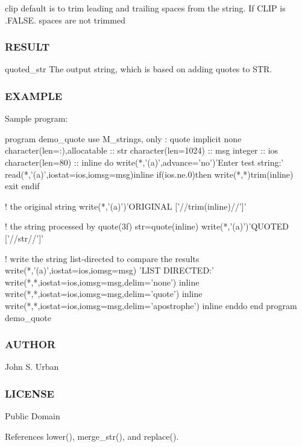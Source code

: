 clip default is to trim leading and trailing spaces from the string. If C\+L\+IP is .F\+A\+L\+SE. spaces are not trimmed

\subsubsection*{R\+E\+S\+U\+LT}

quoted\+\_\+str The output string, which is based on adding quotes to S\+TR. \subsubsection*{E\+X\+A\+M\+P\+LE}

Sample program\+: \begin{DoxyVerb}program demo_quote
use M_strings, only : quote
implicit none
character(len=:),allocatable :: str
character(len=1024)          :: msg
integer                      :: ios
character(len=80)            :: inline
   do
      write(*,'(a)',advance='no')'Enter test string:'
      read(*,'(a)',iostat=ios,iomsg=msg)inline
      if(ios.ne.0)then
         write(*,*)trim(inline)
         exit
      endif

      ! the original string
      write(*,'(a)')'ORIGINAL     ['//trim(inline)//']'

      ! the string processed by quote(3f)
      str=quote(inline)
      write(*,'(a)')'QUOTED     ['//str//']'

      ! write the string list-directed to compare the results
      write(*,'(a)',iostat=ios,iomsg=msg) 'LIST DIRECTED:'
      write(*,*,iostat=ios,iomsg=msg,delim='none') inline
      write(*,*,iostat=ios,iomsg=msg,delim='quote') inline
      write(*,*,iostat=ios,iomsg=msg,delim='apostrophe') inline
   enddo
end program demo_quote
\end{DoxyVerb}


\subsubsection*{A\+U\+T\+H\+OR}

John S. Urban \subsubsection*{L\+I\+C\+E\+N\+SE}

Public Domain 

References lower(), merge\+\_\+str(), and replace().

